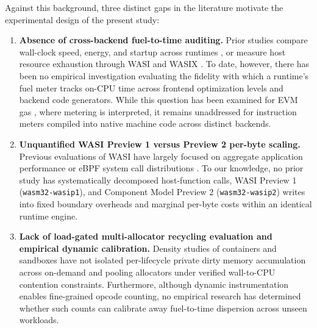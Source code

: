 \documentclass{ws-jcsc}
\begin{document}
Against this background, three distinct gaps in the literature motivate the experimental design of the present study:
\begin{enumerate}
\item \textbf{Absence of cross-backend fuel-to-time auditing.} Prior studies compare wall-clock speed, energy, and startup across runtimes \cite{jangda2019not, khan2026taxonomy, kakati2024cross}, or measure host resource exhaustion through WASI and WASIX \cite{yu2025resource}. To date, however, there has been no empirical investigation evaluating the fidelity with which a runtime's fuel meter tracks on-CPU time across frontend optimization levels and backend code generators. While this question has been examined for EVM gas \cite{yang2019empirically, perez2020broken}, where metering is interpreted, it remains unaddressed for instruction meters compiled into native machine code across distinct backends.
\item \textbf{Unquantified WASI Preview 1 versus Preview 2 per-byte scaling.} Previous evaluations of WASI have largely focused on aggregate application performance or eBPF system call distributions \cite{mao2024ewapa, yu2026wasc}. To our knowledge, no prior study has systematically decomposed host-function calls, WASI Preview 1 (\texttt{wasm32-wasip1}), and Component Model Preview 2 (\texttt{wasm32-wasip2}) writes into fixed boundary overheads and marginal per-byte costs within an identical runtime engine.
\item \textbf{Lack of load-gated multi-allocator recycling evaluation and empirical dynamic calibration.} Density studies of containers and sandboxes \cite{jansen2025memory, shillaker2020faasm} have not isolated per-lifecycle private dirty memory accumulation across on-demand and pooling allocators under verified wall-to-CPU contention constraints. Furthermore, although dynamic instrumentation \cite{titzer2024flexible} enables fine-grained opcode counting, no empirical research has determined whether such counts can calibrate away fuel-to-time dispersion across unseen workloads.
\end{enumerate}

\end{document}
